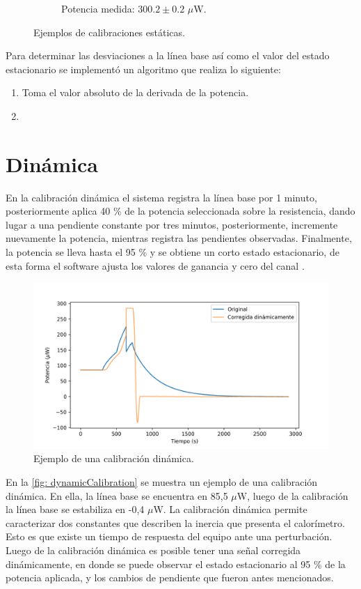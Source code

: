 \begin{figure}[h]
\begin{subfigure}{0.45\linewidth}
			\caption{Potencia medida: $300.2 \pm 0.2$ $\mu$W.}
			\label{fig: noZeroCal}
		\end{subfigure}
		\caption{Ejemplos de calibraciones estáticas.}
		\label{fig: staticCalibrations}
	\end{figure}

	Para determinar las desviaciones a la línea base así como el valor del estado estacionario se implementó un algoritmo que realiza lo siguiente:
	\begin{enumerate}
		\item Toma el valor absoluto de la derivada de la potencia.
		\item 
	\end{enumerate}
	
	\section{Din\'amica}
	En la calibración dinámica el sistema registra la línea base por 1 minuto, posteriormente aplica 40 \% de la potencia seleccionada sobre la resistencia, dando lugar a una pendiente constante por tres minutos, posteriormente, incremente nuevamente la potencia, mientras registra las pendientes observadas. Finalmente, la potencia se lleva hasta el 95 \% y se obtiene un corto estado estacionario, de esta forma el software ajusta los valores de ganancia y cero del canal \cite{Suurkuusk}. 
	\begin{figure}[h!]
		\centering
		\includegraphics[width=0.8\linewidth]{../Data/ElectricalCalibrations/Dynamic/dynamic}
		\caption{Ejemplo de una calibración dinámica.}
		\label{fig: dynamicCalibration}
	\end{figure}

	En la \autoref{fig: dynamicCalibration} se muestra un ejemplo de una calibración dinámica. En ella, la línea base se encuentra en 85,5 $\mu$W, luego de la calibración la línea base se estabiliza en -0,4 $\mu$W. La calibración dinámica permite caracterizar dos constantes que describen la inercia que presenta el calorímetro. Esto es que existe un tiempo de respuesta del equipo ante una perturbación. Luego de la calibración dinámica es posible tener una señal corregida dinámicamente, en donde se puede observar el estado estacionario al 95 \% de la potencia aplicada, y los cambios de pendiente que fueron antes mencionados.
	
